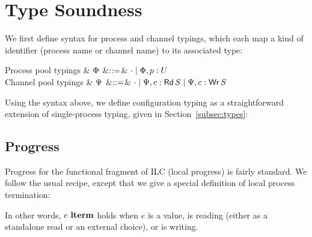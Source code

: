 \section{Type Soundness}
\label{sec:ilcproofs}

We first define syntax for process and channel typings, which each map a kind of
identifier (process name or channel name) to its associated type:

\begin{grammar}
    Process pool typings
    & $\Phi$
    &$\mathrel{::=}$& $\cdot \mathrel{\mid} \Phi,p: U$
    \\
    Channel pool typings
    & $\Psi$
    &$\mathrel{::=}$& $\cdot \mathrel{\mid} \Psi,c:\textnormal{\textsf{Rd}}\,S \mathrel{\mid} \Psi,c:\textnormal{\textsf{Wr}}\,S$
\end{grammar}


Using the syntax above, we define configuration typing as a straightforward
extension of single-process typing, given in
Section~\ref{subsec:types}:\smallskip


\subsection{Progress}
\label{subsec:label}

Progress for the functional fragment of ILC (local progress) is fairly
standard. We follow the usual recipe, except that we give a special definition
of local process termination:\smallskip

In other words, $e~\textbf{lterm}$ holds when $e$ is a value, is reading (either as a
standalone read or an external choice), or is writing.

